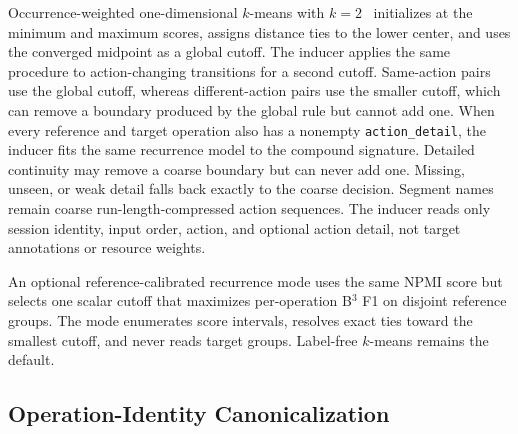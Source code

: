 \documentclass[letterpaper]{article}
\begin{document}
Occurrence-weighted one-dimensional $k$-means with $k=2$~\cite{macqueen1967}
initializes at the minimum and maximum scores, assigns distance ties to the
lower center, and uses the converged midpoint as a global cutoff. The inducer
applies the same procedure to action-changing transitions for a second cutoff.
Same-action pairs use the global cutoff, whereas different-action pairs use the
smaller cutoff, which can remove a boundary produced by the global rule but
cannot add one. When every reference and target operation also has a nonempty
\texttt{action\_detail}, the inducer fits the same recurrence model to the
compound signature. Detailed continuity may remove a coarse boundary but can
never add one. Missing, unseen, or weak detail falls back exactly to the coarse
decision. Segment names remain coarse run-length-compressed action sequences.
The inducer reads only session identity, input order, action, and optional
action detail, not target annotations or resource weights.

An optional reference-calibrated recurrence mode uses the same NPMI score but
selects one scalar cutoff that maximizes per-operation B$^3$ F1 on disjoint
reference groups. The mode enumerates score intervals, resolves exact ties
toward the smallest cutoff, and never reads target groups. Label-free
$k$-means remains the default.

\subsection{Operation-Identity Canonicalization}
\label{app:canonicalization}
\end{document}
